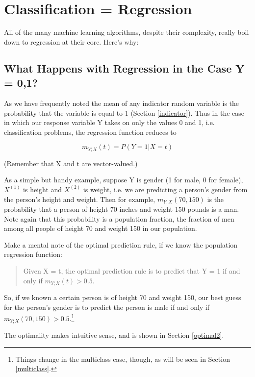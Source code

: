 \section{Classification = Regression}
\label{meanisprob}

All of the many machine learning algorithms, despite their
complexity, really boil down to regression at their core.  Here's why:

\subsection{What Happens with Regression in the Case Y = 0,1?}

As we have frequently noted the mean of any indicator random variable is
the probability that the variable is equal to 1 (Section
\ref{indicator}).  Thus in the case in which our response variable Y
takes on only the values 0 and 1, i.e.  classification problems, the
regression function reduces to

\begin{equation}
m_{Y;X}(t) = P(Y = 1 | X = t)
\end{equation}

(Remember that X and t are vector-valued.)

As a simple but handy example, suppose Y is gender (1 for male, 0 for
female), $X^{(1)}$ is height and $X^{(2)}$ is weight, i.e. we are
predicting a person's gender from the person's height and weight.  Then
for example, $m_{Y;X}(70,150)$ is the probability that a person of
height 70 inches and weight 150 pounds is a man.  Note again that this
probability is a population fraction, the fraction of men among all
people of height 70 and weight 150 in our population.

Make a mental note of the optimal prediction rule, if we know the
population regression function:

\begin{quote}
Given X = t, the optimal prediction rule is to predict that Y = 1 if and
only if $m_{Y;X}(t) > 0.5$.
\end{quote}

So, if we known a certain person is of height 70 and weight 150, our
best guess for the person's gender is to predict the person is male
if and only if $m_{Y;X}(70,150) > 0.5$.\footnote{Things change in the
multiclass case, though, as will be seen in Section \ref{multiclass}.}

The optimality makes intuitive sense, and is shown in Section
\ref{optimal2}.   

